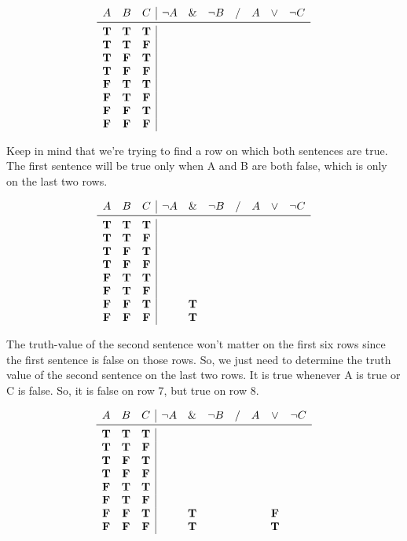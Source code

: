 \documentclass[../logic-text.tex]{subfiles}
\begin{document}
\[
\begin{array}{ccc|ccccccc}
  A & B & C & \lneg A & \land & \lneg B & / & A & \lor & \lneg C \\ \midrule
  \true & \true & \true   &&&&&&& \\
  \true & \true & \false  &&&&&&& \\
  \true & \false & \true  &&&&&&& \\
  \true & \false & \false &&&&&&& \\
  \false & \true & \true  &&&&&&& \\
  \false & \true & \false &&&&&&& \\
  \false & \false & \true &&&&&&& \\
  \false & \false & \false &&&&&&& \\
\end{array}
\]

Keep in mind that we're trying to find a row on which both sentences are true.
The first sentence will be true only when A and B are both false, which is only on the last two rows.

\[
\begin{array}{ccc|ccccccc}
  A & B & C & \lneg A & \land & \lneg B & / & A & \lor & \lneg C \\ \midrule
  \true & \true & \true   &&  &&&&& \\
  \true & \true & \false  &&  &&&&& \\
  \true & \false & \true  &&  &&&&& \\
  \true & \false & \false &&  &&&&& \\
  \false & \true & \true  &&  &&&&& \\
  \false & \true & \false &&  &&&&& \\
  \false & \false & \true && \true &&&&& \\
  \false & \false & \false && \true &&&&& \\
\end{array}
\]

The truth-value of the second sentence won't matter on the first six rows since the first sentence is false on those rows.
So, we just need to determine the truth value of the second sentence on the last two rows.
It is true whenever A is true or C is false.
So, it is false on row 7, but true on row 8.

\[
\begin{array}{ccc|ccccccc}
  A & B & C & \lneg A & \land & \lneg B & / & A & \lor & \lneg C \\ \midrule
  \true & \true & \true   &&  &&&&& \\
  \true & \true & \false  &&  &&&&& \\
  \true & \false & \true  &&  &&&&& \\
  \true & \false & \false &&  &&&&& \\
  \false & \true & \true  &&  &&&&& \\
  \false & \true & \false &&  &&&&& \\
  \false & \false & \true && \true &&&& \false & \\
  \false & \false & \false && \true &&&& \true & \\
\end{array}
\]
\end{document}
